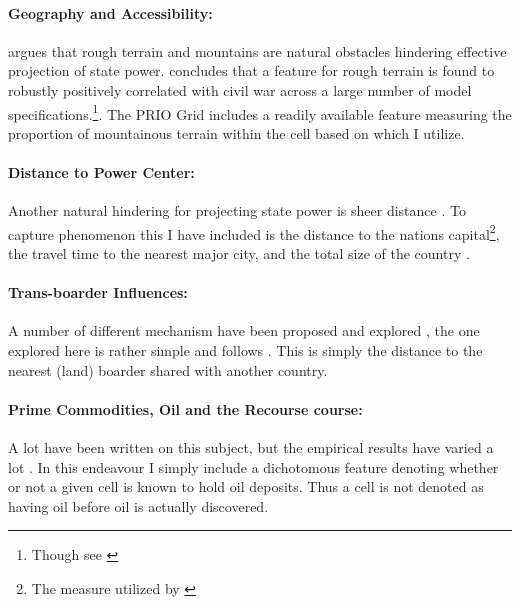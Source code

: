 \documentclass[a4paper]{article}
\begin{document}
\paragraph{Geography and Accessibility:} \cite{Fearon_Laitin_2003} argues that rough terrain and mountains are natural obstacles hindering effective projection of state power. \cite{Hegre_Sambanis_2006} concludes that a feature for rough terrain is found to robustly positively correlated with civil war across a large number of model specifications.\cite[526-529]{Hegre_Sambanis_2006}\footnote{Though see \cite{Goldstone_2010}}. The PRIO Grid includes a readily available feature measuring the proportion of mountainous terrain within the cell based on \cite{Blyth_2002} which I utilize.\par

\paragraph{Distance to Power Center:} Another natural hindering for projecting state power is sheer distance \citep{Fearon_2004, Buhaug_Gates_Lujala_2009, Cederman_Buhaug_Roed_2009, Buhaug_2010}. To capture phenomenon this I have included is the distance to the nations capital\footnote{The measure utilized by \cite{Buhaug_2010}}, the travel time to the nearest major city, and the total size of the country \citep{prio_code_2015}.\par

\paragraph{Trans-boarder Influences:} A number of different mechanism have been proposed and explored \citep[29-30]{Blattman_Miguel_2010}, the one explored here is rather simple and follows \cite{Hegre_Sambanis_2006}. This is simply the distance to the nearest (land) boarder shared with another country.\par 

\paragraph{Prime Commodities, Oil and the Recourse course:} A lot have been written on this subject, but the empirical results have varied a lot \citep{Collier_Hoeffler_1998, Fearon_Laitin_2003, Fearon_2004, Ross_2004, Collier_Hoeffler_2004, Fearon_2005, Buhaug_2010, Hegre_Oestby_Raleigh_2009}. In this endeavour I simply include a dichotomous feature denoting whether or not a given cell is known to hold oil deposits. Thus a cell is not denoted as having oil before oil is actually discovered.\par
\end{document}
